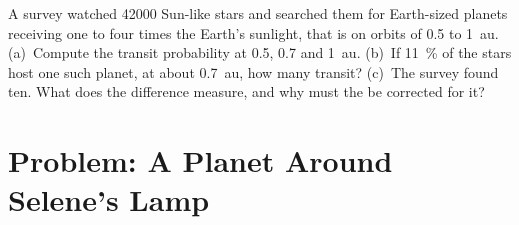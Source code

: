 \begin{exercise}[$\star\star\star$]\label{exo:b3:exoplanets:12}
A survey watched \num{42000} Sun-like stars and searched them for
Earth-sized planets receiving one to four times the Earth's sunlight,
that is on orbits of 0.5 to \qty{1}{au}. (a)~Compute the transit
probability at 0.5, 0.7 and \qty{1}{au}. (b)~If \qty{11}{\percent} of the
stars host one such planet, at about \qty{0.7}{au}, how many transit?
(c)~The survey found ten. What does the difference measure, and why must
the  be corrected for it?
\end{exercise}

\section{Problem: A Planet Around Selene's Lamp}

